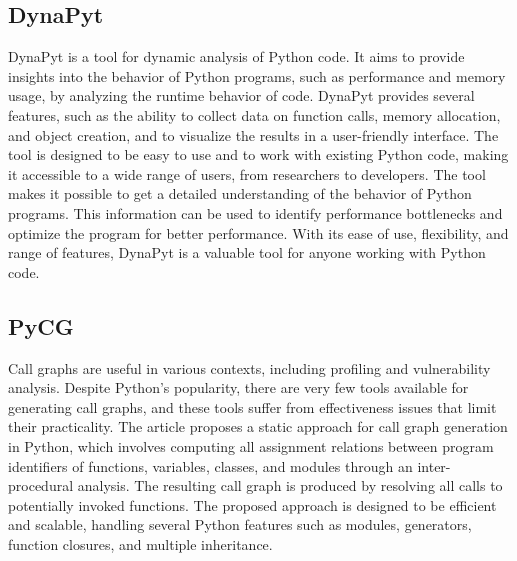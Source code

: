 \subsection{DynaPyt}
DynaPyt is a tool for dynamic analysis of Python code.
It aims to provide insights into the behavior of Python programs, such as performance and memory usage, by analyzing the runtime behavior of code.
DynaPyt provides several features, such as the ability to collect data on function calls, memory allocation, and object creation, and to visualize the results in a user-friendly interface.
The tool is designed to be easy to use and to work with existing Python code, making it accessible to a wide range of users, from researchers to developers.
The tool makes it possible to get a detailed understanding of the behavior of Python programs.
This information can be used to identify performance bottlenecks and optimize the program for better performance.
With its ease of use, flexibility, and range of features, DynaPyt is a valuable tool for anyone working with Python code.

\subsection{PyCG}
Call graphs are useful in various contexts, including profiling and vulnerability analysis.
Despite Python's popularity, there are very few tools available for generating call graphs, and these tools suffer from effectiveness issues that limit their practicality.
The article proposes a static approach for call graph generation in Python, which involves computing all assignment relations between program identifiers of functions, variables, classes, and modules through an inter-procedural analysis.
The resulting call graph is produced by resolving all calls to potentially invoked functions.
The proposed approach is designed to be efficient and scalable, handling several Python features such as modules, generators, function closures, and multiple inheritance.\cite{PyCG_2021}


